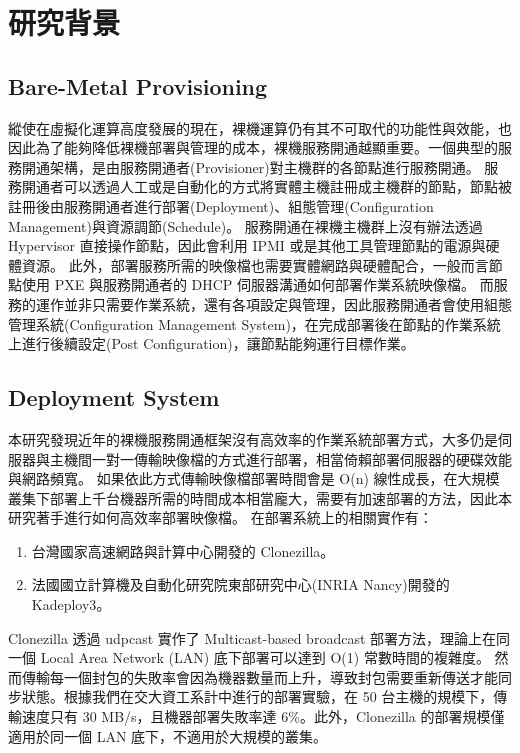 \chapter{研究背景}
\section{Bare-Metal Provisioning}
縱使在虛擬化運算高度發展的現在，裸機運算仍有其不可取代的功能性與效能，也因此為了能夠降低裸機部署與管理的成本，裸機服務開通越顯重要。一個典型的服務開通架構，是由服務開通者(Provisioner)對主機群的各節點進行服務開通。
服務開通者可以透過人工或是自動化的方式將實體主機註冊成主機群的節點，節點被註冊後由服務開通者進行部署(Deployment)、組態管理(Configuration Management)與資源調節(Schedule)。
服務開通在裸機主機群上沒有辦法透過 Hypervisor 直接操作節點，因此會利用 IPMI 或是其他工具管理節點的電源與硬體資源。
此外，部署服務所需的映像檔也需要實體網路與硬體配合，一般而言節點使用 PXE 與服務開通者的 DHCP 伺服器溝通如何部署作業系統映像檔。
而服務的運作並非只需要作業系統，還有各項設定與管理，因此服務開通者會使用組態管理系統(Configuration Management System)，在完成部署後在節點的作業系統上進行後續設定(Post Configuration)，讓節點能夠運行目標作業。


\section{Deployment System}
本研究發現近年的裸機服務開通框架\cite{chandrasekar2014comparative}沒有高效率的作業系統部署方式，大多仍是伺服器與主機間一對一傳輸映像檔的方式進行部署，相當倚賴部署伺服器的硬碟效能與網路頻寬。
如果依此方式傳輸映像檔部署時間會是 O(n) 線性成長，在大規模叢集下部署上千台機器所需的時間成本相當龐大，需要有加速部署的方法，因此本研究著手進行如何高效率部署映像檔。
在部署系統上的相關實作有：

\begin{enumerate}
\item 台灣國家高速網路與計算中心開發的 Clonezilla\cite{shiau2008clonezilla}。
\item 法國國立計算機及自動化研究院東部研究中心(INRIA Nancy)開發的 Kadeploy3\cite{kadeploy3}。
\end{enumerate}


Clonezilla 透過 udpcast 實作了 Multicast-based broadcast 部署方法，理論上在同一個 Local Area Network (LAN) 底下部署可以達到 O(1) 常數時間的複雜度。
然而傳輸每一個封包的失敗率會因為機器數量而上升，導致封包需要重新傳送才能同步狀態。根據我們在交大資工系計中進行的部署實驗，在 50 台主機的規模下，傳輸速度只有 30 MB/s，且機器部署失敗率達 6\%。此外，Clonezilla 的部署規模僅適用於同一個 LAN 底下，不適用於大規模的叢集。


